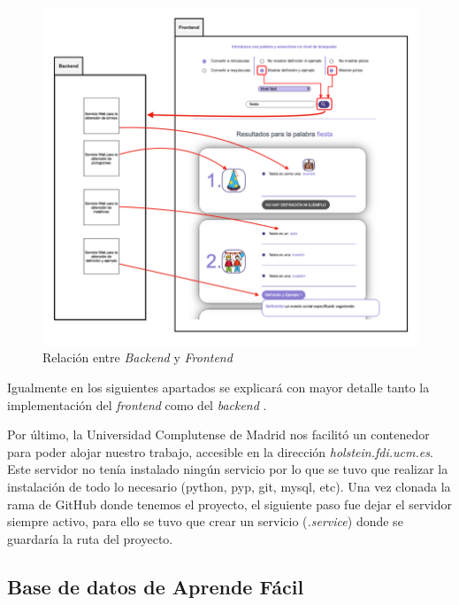 \begin{figure}[!h]
	\includegraphics[width=1.2\textwidth]{Imagenes/Bitmap/Capitulo4/RelacionBackFront.png}
	\centering
	\caption{Relación entre \textit{Backend} y \textit{Frontend}}
	\label{fig:relacionBackFront}
\end{figure}


 Igualmente en los siguientes apartados se explicará con mayor detalle tanto la implementación del \textit{frontend} como del \textit{backend} . 

Por último, la Universidad Complutense de Madrid nos facilitó un contenedor para poder alojar nuestro trabajo, accesible en la dirección \textit{holstein.fdi.ucm.es}. Este servidor no tenía instalado ningún servicio por lo que se tuvo que realizar la instalación de todo lo necesario (python, pyp, git, mysql, etc). Una vez clonada la rama de GitHub donde tenemos el proyecto, el siguiente paso fue dejar el servidor siempre activo, para ello se tuvo que crear un servicio (\textit{.service}) donde se guardaría la ruta del proyecto.

\subsection{Base de datos de Aprende Fácil}
\label{cap:subsec:database}

